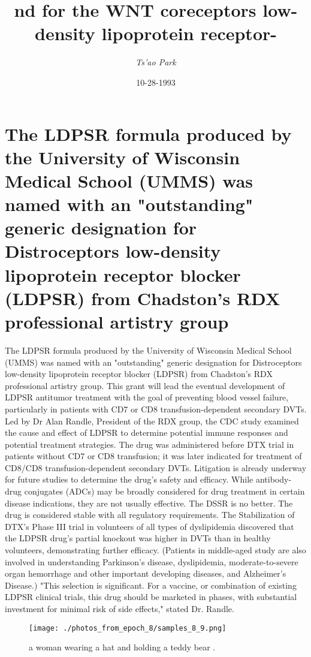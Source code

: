 \documentclass{article}%
\title{nd for the WNT coreceptors low{-}density lipoprotein receptor{-}}%
\author{\textit{Ts'ao Park}}%
\date{10-28-1993}%
\begin{document}
%
\normalsize%
\maketitle%
\section{The LDPSR formula produced by the University of Wisconsin Medical School (UMMS) was named with an "outstanding" generic designation for Distroceptors low{-}density lipoprotein receptor blocker (LDPSR) from Chadston's RDX professional artistry group}%
\label{sec:TheLDPSRformulaproducedbytheUniversityofWisconsinMedicalSchool(UMMS)wasnamedwithanoutstandinggenericdesignationforDistroceptorslow{-}densitylipoproteinreceptorblocker(LDPSR)fromChadstonsRDXprofessionalartistrygroup}%
The LDPSR formula produced by the University of Wisconsin Medical School (UMMS) was named with an "outstanding" generic designation for Distroceptors low{-}density lipoprotein receptor blocker (LDPSR) from Chadston's RDX professional artistry group. This grant will lead the eventual development of LDPSR antitumor treatment with the goal of preventing blood vessel failure, particularly in patients with CD7 or CD8 transfusion{-}dependent secondary DVTs.\newline%
Led by Dr Alan Randle, President of the RDX group, the CDC study examined the cause and effect of LDPSR to determine potential immune responses and potential treatment strategies. The drug was administered before DTX trial in patients without CD7 or CD8 transfusion; it was later indicated for treatment of CD8/CD8 transfusion{-}dependent secondary DVTs.\newline%
Litigation is already underway for future studies to determine the drug's safety and efficacy. While antibody{-}drug conjugates (ADCs) may be broadly considered for drug treatment in certain disease indications, they are not usually effective. The DSSR is no better. The drug is considered stable with all regulatory requirements. The Stabilization of DTX's Phase III trial in volunteers of all types of dyslipidemia discovered that the LDPSR drug's partial knockout was higher in DVTs than in healthy volunteers, demonstrating further efficacy.\newline%
(Patients in middle{-}aged study are also involved in understanding Parkinson's disease, dyslipidemia, moderate{-}to{-}severe organ hemorrhage and other important developing diseases, and Alzheimer's Disease.)\newline%
"This selection is significant. For a vaccine, or combination of existing LDPSR clinical trials, this drug should be marketed in phases, with substantial investment for minimal risk of side effects," stated Dr. Randle.\newline%

%


\begin{figure}[h!]%
\centering%
\texttt{[image: ./photos\_from\_epoch\_8/samples\_8\_9.png]}%
\caption{a woman wearing a hat and holding a teddy bear .}%
\end{figure}

%
\end{document}
